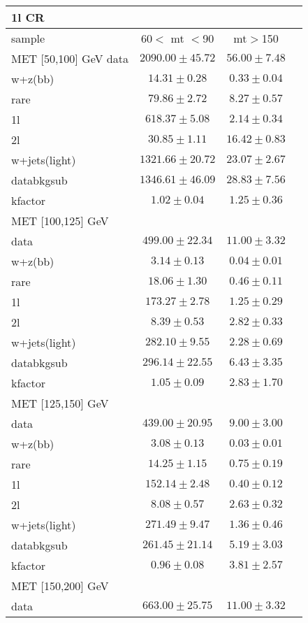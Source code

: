 \begin{table}
\begin{center}
\small
\begin{tabular}{lccc}
\hline
1l CR   & &\\
\hline
sample&60$<$ mt $<$90&mt$>$150\\
\hline
MET [50,100] GeV\hline
data&$2090.00\pm45.72$&$56.00\pm7.48$\\
\hline
w+z(bb)&$14.31\pm0.28$&$0.33\pm0.04$\\
rare&$79.86\pm2.72$&$8.27\pm0.57$\\
1l&$618.37\pm5.08$&$2.14\pm0.34$\\
2l&$30.85\pm1.11$&$16.42\pm0.83$\\
w+jets(light)&$1321.66\pm20.72$&$23.07\pm2.67$\\
\hline
databkgsub&$1346.61\pm46.09$&$28.83\pm7.56$\\
kfactor&$1.02\pm0.04$&$1.25\pm0.36$\\
\hline\hline
\hline
MET [100,125] GeV  & &\\
\hline
data&$499.00\pm22.34$&$11.00\pm3.32$\\
\hline
w+z(bb)&$3.14\pm0.13$&$0.04\pm0.01$\\
rare&$18.06\pm1.30$&$0.46\pm0.11$\\
1l&$173.27\pm2.78$&$1.25\pm0.29$\\
2l&$8.39\pm0.53$&$2.82\pm0.33$\\
w+jets(light)&$282.10\pm9.55$&$2.28\pm0.69$\\
\hline
databkgsub&$296.14\pm22.55$&$6.43\pm3.35$\\
kfactor&$1.05\pm0.09$&$2.83\pm1.70$\\
\hline\hline
\hline
MET [125,150] GeV  & &\\
\hline
data&$439.00\pm20.95$&$9.00\pm3.00$\\
\hline
w+z(bb)&$3.08\pm0.13$&$0.03\pm0.01$\\
rare&$14.25\pm1.15$&$0.75\pm0.19$\\
1l&$152.14\pm2.48$&$0.40\pm0.12$\\
2l&$8.08\pm0.57$&$2.63\pm0.32$\\
w+jets(light)&$271.49\pm9.47$&$1.36\pm0.46$\\
\hline
databkgsub&$261.45\pm21.14$&$5.19\pm3.03$\\
kfactor&$0.96\pm0.08$&$3.81\pm2.57$\\
\hline\hline
\hline
MET [150,200] GeV   & &\\
\hline
data&$663.00\pm25.75$&$11.00\pm3.32$\\

\end{tabular}
\end{center}
\end{table}
